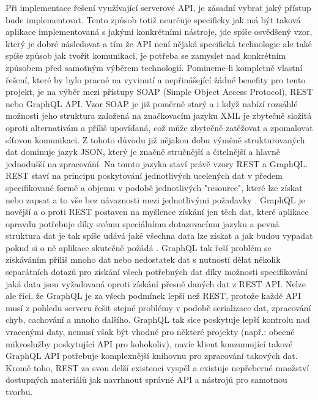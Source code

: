 	Při implementace řešení využívající serverové \ac{API}, je zásadní vybrat jaký přístup bude implementovat.
	Tento způsob totiž neurčuje specificky jak má být taková aplikace implementovaná s jakými konkrétními nástroje, jde
	spíše osvědšený vzor, který je dobré následovat a tím že \ac{API} není nějaká specifická technologie ale také spíše
	způsob jak tvořit komunikaci, je potřeba se zamyslet nad konkrétním způsobem před samotným výběrem technologií.
	Pomineme-li kompletně vlastní řešení, které by bylo pracné na vyvinutí a nepřinášející žádné benefity pro tento projekt,
	je na výběr mezi přístupy \ac{SOAP} (Simple Object Access Protocol), \ac{REST} nebo GraphQL \ac{API}.
	Vzor \ac{SOAP} je již poměrně starý a i když nabízí rozsáhlé možnosti jeho struktura založená na značkovacím jazyku
	\ac{XML} je zbytečně složitá oproti alternativám a příliš upovídaná, což může zbytečně zatěžovat a zpomalovat
	síťovou komunikaci.
	Z tohoto důvodu již nějakou dobu výměně strukturovaných dat dominuje jazyk \ac{JSON}, který je značně stručnější a
	čitelnější a hlavně jednodušší na zpracování.
	Na tomto jazyka staví právě vzory \ac{REST} a GraphQL.
	\ac{REST} staví na principu poskytování jednotlivých ucelených dat v předem specifikované formě a objemu v
	podobě jednotlivých "resource", které lze získat nebo zapsat a to vše bez návaznosti mezi jednotlivými požadavky
	\cite{restfulapi}.
	GraphQL je novější a o proti \ac{REST} postaven na myšlence získání jen těch dat, které aplikace opravdu potřebuje díky svému
	speciálnímu dotazovacímu jazyku a pevná struktura dat je tak spíše udává jaké všechna data lze získat a jak budou vypadat
	pokud si o ně aplikace skutečně požádá \cite{graphql}.
	GraphQL tak řeší problém se získáváním příliš mnoho dat nebo nedostatek dat s nutností dělat několik separátních dotazů
	pro získání všech potřebných dat díky možnosti specifikování jaká data jsou vyžadovaná oproti získání
	přesně daných dat z \ac{REST} \ac{API}.
	Nelze ale říci, že GraphQL je za všech podmínek lepší než \ac{REST}, protože každé \ac{API} musí z pohledu serveru
	řešit stejné problémy v podobě serializace dat, zpracování chyb, cachování a mnoho dalšího.
	GraphQL tak sice poskytuje lepší kontrolu nad vracenými daty, nemusí však být vhodné pro některé projekty (např.:
	obecné mikroslužby poskytující \ac{API} pro kohokoliv), navíc klient konzumující takové GraphQL \ac{API} potřebuje
	komplexnější knihovnu pro zpracování takových dat.
	Kromě toho, \ac{REST} za svou delší existenci vyspěl a existuje nepřeberné množství dostupných materiálů jak navrhnout
	správné \ac{API} a nástrojů pro samotnou tvorbu.

